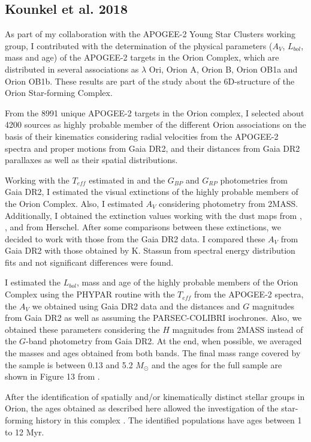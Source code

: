 \documentclass[12pt]{article}
\begin{document}
\subsection{Kounkel et al. 2018}
\label{sec:Kounkel}
As part of my collaboration with the APOGEE-2 Young Star Clusters working group, I contributed with the determination of the physical parameters ($A_V$, $L_{bol}$, mass and age) of the APOGEE-2 targets in the Orion Complex, which are distributed in several associations as $\lambda$ Ori, Orion A, Orion B, Orion OB1a and Orion OB1b. These results are part of the \citet{Kounkel2018} study about the 6D-structure of the Orion Star-forming Complex.

From the 8991 unique APOGEE-2 targets in the Orion complex, I selected about 4200 sources as highly probable member of the different Orion associations on the basis of their kinematics considering radial velocities from the APOGEE-2 spectra \citep{Kounkel2018} and proper motions from Gaia DR2, and their distances from Gaia DR2 parallaxes as well as their spatial distributions.

Working with the $T_{eff}$ estimated in \citet{Kounkel2018} and the $G_{BP}$ and $G_{RP}$ photometries from Gaia DR2, I estimated the visual extinctions of the highly probable members of the Orion Complex. Also, I estimated $A_V$ considering photometry from 2MASS. Additionally, I obtained the extinction values working with the dust maps from \citet{Schlegel1998}, \citet{Gontcharov2017}, \citet{Green2018} and from Herschel. After some comparisons between these extinctions, we decided to work with those from the Gaia DR2 data. I compared these $A_V$ from Gaia DR2 with those obtained by K. Stassun from spectral energy distribution fits and not significant differences were found.

I estimated the $L_{bol}$, mass and age of the highly probable members of the Orion Complex using the PHYPAR routine with the $T_{eff}$ from the APOGEE-2 spectra, the $A_V$ we obtained using Gaia DR2 data and the distances and $G$ magnitudes from Gaia DR2 as well as assuming the PARSEC-COLIBRI isochrones. Also, we obtained these parameters considering the $H$ magnitudes from 2MASS instead of the $G$-band photometry from Gaia DR2. At the end, when possible, we averaged the masses and ages obtained from both bands. The final mass range covered by the sample is between 0.13 and 5.2 $M_\odot$ and the ages for the full sample are shown in Figure 13 from \citet{Kounkel2018}. 

After the identification of spatially and/or kinematically distinct stellar groups in Orion, the ages obtained as described here allowed the investigation of the star-forming history in this complex \citep{Kounkel2018}. The identified populations have ages between 1 to 12 Myr.
\end{document}
